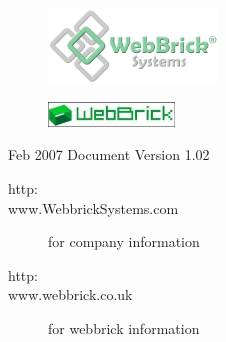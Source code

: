 \documentclass[a4paper,12pt]{article}
\title{\sf{Datasheet for Temperature Sensors}}
\author{Andy Harris}
\begin{document}
\maketitle

\begin{figure}[H]
\centering
\includegraphics[width=0.4\textwidth]{Images/WebBrickSystems.png}
\end{figure}

\begin{figure}[H]
\centering
\includegraphics[width=0.3\textwidth]{Images/wb_logo.jpg}
\end{figure}


\begin{description}
\item[Feb 2007 Document Version 1.02]
\end{description}

\begin{description}
\item[http:\\www.WebbrickSystems.com] for company information
\item[http:\\www.webbrick.co.uk] for webbrick information
\end{description}

\pagebreak


\end{document}
